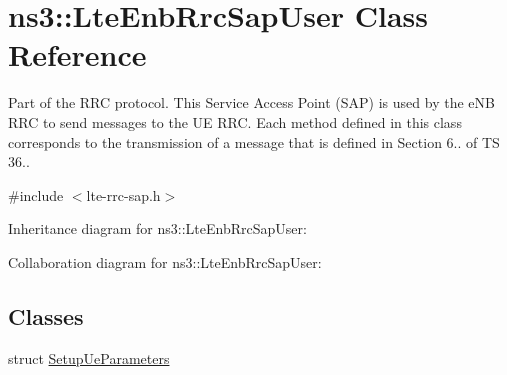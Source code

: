 \hypertarget{classns3_1_1LteEnbRrcSapUser}{}\section{ns3\+:\+:Lte\+Enb\+Rrc\+Sap\+User Class Reference}
\label{classns3_1_1LteEnbRrcSapUser}


Part of the R\+RC protocol. This Service Access Point (S\+AP) is used by the e\+NB R\+RC to send messages to the UE R\+RC. Each method defined in this class corresponds to the transmission of a message that is defined in Section 6.. of TS 36..  




{\ttfamily \#include $<$lte-\/rrc-\/sap.\+h$>$}



Inheritance diagram for ns3\+:\+:Lte\+Enb\+Rrc\+Sap\+User\+:


Collaboration diagram for ns3\+:\+:Lte\+Enb\+Rrc\+Sap\+User\+:
\subsection*{Classes}
\begin{DoxyCompactItemize}
\item 
struct \hyperlink{structns3_1_1LteEnbRrcSapUser_1_1SetupUeParameters}{Setup\+Ue\+Parameters}
\end{DoxyCompactItemize}
